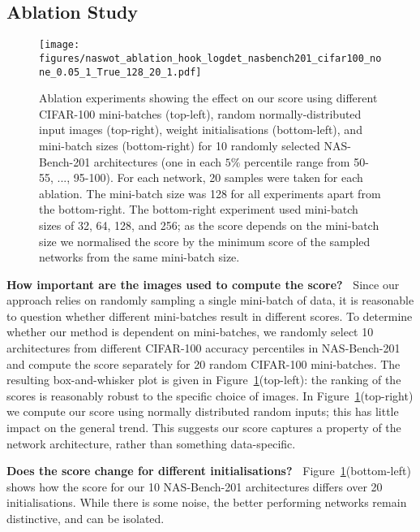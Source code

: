 \documentclass{article}
\begin{document}
\subsection{Ablation Study}
\label{sec:ablation}

\begin{figure}[!h]
    \centering
    \texttt{[image: figures/naswot\_ablation\_hook\_logdet\_nasbench201\_cifar100\_none\_0.05\_1\_True\_128\_20\_1.pdf]}
  \caption{Ablation experiments showing the effect on our score using different CIFAR-100 mini-batches (top-left), random normally-distributed input images (top-right), weight initialisations (bottom-left), and mini-batch sizes (bottom-right) for 10 randomly selected NAS-Bench-201 architectures (one in each $5\%$ percentile range from 50-55, ..., 95-100). For each network, 20 samples were taken for each ablation. The mini-batch size was 128 for all experiments apart from the bottom-right. The bottom-right experiment used mini-batch sizes of 32, 64, 128, and 256; as the score depends on the mini-batch size we normalised the score by the minimum score of the sampled networks from the same mini-batch size.
  }
    \label{fig:ablationscore}  
    \vspace{-4mm}
\end{figure}

\textbf{How important are the images used to compute the score?\ } Since our approach relies on randomly sampling a single mini-batch of data, it is reasonable to question whether different mini-batches result in different scores. To determine whether our method is dependent on mini-batches, we randomly select 10 architectures from different CIFAR-100 accuracy percentiles in NAS-Bench-201 and compute the score separately for 20 random CIFAR-100 mini-batches. The resulting box-and-whisker plot is given in Figure~\ref{fig:ablationscore}(top-left): the ranking of the scores is reasonably robust to the specific choice of images. In Figure~\ref{fig:ablationscore}(top-right) we compute our score using normally distributed random inputs; this has little impact on the general trend. This suggests our score captures a property of the network architecture, rather than something data-specific.

\textbf{Does the score change for different initialisations?\ } Figure~\ref{fig:ablationscore}(bottom-left) shows how the score for our 10 NAS-Bench-201 architectures differs over 20 initialisations. While there is some noise, the better performing networks remain distinctive, and can be isolated.
\end{document}
